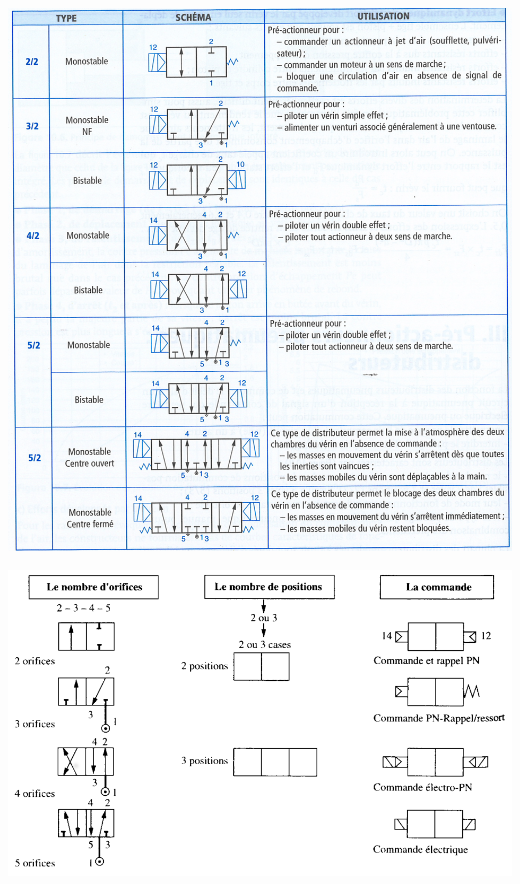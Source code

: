 \begin{center}

\includegraphics[width=5.5in]{media/image115.png}

\includegraphics[width=5.5in]{media/image116.png}

\end{center}